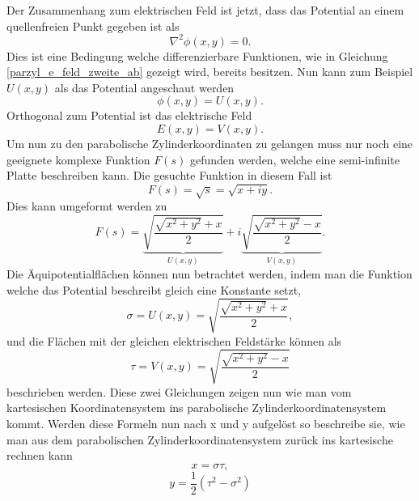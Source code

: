 Der Zusammenhang zum elektrischen Feld ist jetzt, dass das Potential an einem quellenfreien Punkt gegeben ist als 
\begin{equation}
	\nabla^2\phi(x,y) = 0.
\end{equation}
Dies ist eine Bedingung welche differenzierbare Funktionen, wie in Gleichung \ref{parzyl_e_feld_zweite_ab} gezeigt wird, bereits besitzen. 
Nun kann zum Beispiel $U(x,y)$ als das Potential angeschaut werden
\begin{equation}
	\phi(x,y) = U(x,y).
\end{equation}
Orthogonal zum Potential ist das elektrische Feld
\begin{equation}
	E(x,y) = V(x,y).
\end{equation}
Um nun zu den parabolische Zylinderkoordinaten zu gelangen muss nur noch eine geeignete komplexe Funktion $F(s)$ gefunden werden, 
welche eine semi-infinite Platte beschreiben kann.
Die gesuchte Funktion in diesem Fall ist
\begin{equation}
	F(s) 
	= 
	\sqrt{s} 
	= 
	\sqrt{x + iy}.
\end{equation}
Dies kann umgeformt werden zu
\begin{equation}
	F(s) 
	= 
	\underbrace{\sqrt{\frac{\sqrt{x^2+y^2} + x}{2}}}_{U(x,y)} 
	+ 
	i\underbrace{\sqrt{\frac{\sqrt{x^2+y^2} - x}{2}}}_{V(x,y)}
	.
\end{equation}
Die Äquipotentialflächen können nun betrachtet werden, indem man die Funktion welche das Potential beschreibt gleich eine Konstante setzt,
\begin{equation}
	\sigma = U(x,y) = \sqrt{\frac{\sqrt{x^2+y^2} + x}{2}},
\end{equation}
und die Flächen mit der gleichen elektrischen Feldstärke können als
\begin{equation}
	\tau = V(x,y) = \sqrt{\frac{\sqrt{x^2+y^2} - x}{2}}
\end{equation}
beschrieben werden. Diese zwei Gleichungen zeigen nun wie man vom kartesischen Koordinatensystem ins parabolische Zylinderkoordinatensystem kommt. Werden diese Formeln nun nach x und y aufgelöst so beschreibe sie, wie man aus dem parabolischen Zylinderkoordinatensystem zurück ins kartesische rechnen kann
\begin{equation}
	x = \sigma \tau,
\end{equation}
\begin{equation}
	y = \frac{1}{2}\left ( \tau^2 - \sigma^2 \right )
\end{equation}





